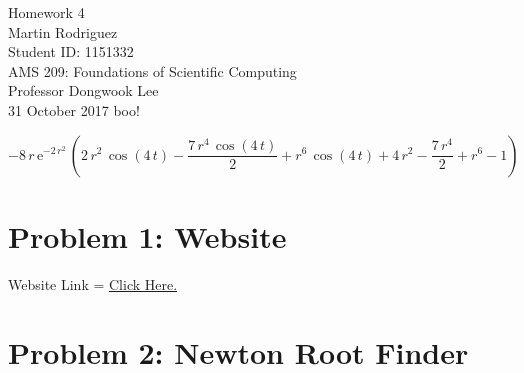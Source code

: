 \documentclass[12pt]{article}
\begin{document}
\begin{center}
	{\LARGE Homework 4} \\[10pt] 
	{ Martin Rodriguez} \\
	Student ID: 1151332\\
	AMS 209: Foundations of Scientific Computing\\
	Professor Dongwook Lee\\[10 pt]	
	31 October 2017 {\tiny boo!} \\[30 pt]
\end{center}


$$-8\,r\,{\mathrm{e}}^{-2\,r^2}\,\left(2\,r^2\,\cos\left(4\,t\right)-\frac{7\,r^4\,\cos\left(4\,t\right)}{2}+r^6\,\cos\left(4\,t\right)+4\,r^2-\frac{7\,r^4}{2}+r^6-1\right)$$


\section*{{\large Problem 1: Website}}

Website Link = \href{https://people.ucsc.edu/~mrodrig6/}{Click Here.}


\section*{{\large Problem 2: Newton Root Finder}}
\end{document}
